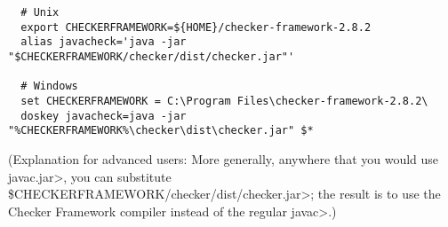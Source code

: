 \begin{itemize}
\begin{Verbatim}
  # Unix
  export CHECKERFRAMEWORK=${HOME}/checker-framework-2.8.2
  alias javacheck='java -jar "$CHECKERFRAMEWORK/checker/dist/checker.jar"'

  # Windows
  set CHECKERFRAMEWORK = C:\Program Files\checker-framework-2.8.2\
  doskey javacheck=java -jar "%CHECKERFRAMEWORK%\checker\dist\checker.jar" $*
\end{Verbatim}

   (Explanation for advanced users:  More generally, anywhere that you would use \<javac.jar>, you can substitute
   \<\$CHECKERFRAMEWORK/checker/dist/checker.jar>;
   the result is to use the Checker
   Framework compiler instead of the regular \<javac>.)

\end{itemize}



%
%
%
%
%
%
%
%
%


